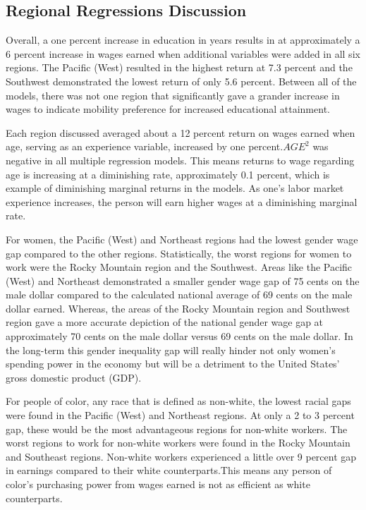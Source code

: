 \documentclass[12pt, English]{article}
\begin{document}
\subsection{Regional Regressions Discussion}
Overall, a one percent increase in education in years results in at approximately a 6 percent increase in wages earned when additional variables were added in all six regions. The Pacific (West) resulted in the highest return at 7.3 percent and the Southwest demonstrated the lowest return of only 5.6 percent. Between all of the models, there was not one region that significantly gave a grander increase in wages to indicate mobility preference for increased educational attainment. 

Each region discussed averaged about a 12 percent return on wages earned when age, serving as an experience variable, increased by one percent.\begin{math} AGE^2 \end{math} was negative in all multiple regression models. This means returns to wage regarding age is increasing at a diminishing rate, approximately 0.1 percent, which is example of diminishing marginal returns in the models. As one’s labor market experience increases, the person will earn higher wages at a diminishing marginal rate.

For women, the Pacific (West) and Northeast regions had the lowest gender wage gap compared to the other regions. Statistically, the worst regions for women to work were the Rocky Mountain region and the Southwest. Areas like the Pacific (West) and Northeast demonstrated a smaller gender wage gap of 75 cents on the male dollar compared to the calculated national average of 69 cents on the male dollar earned. Whereas, the areas of the Rocky Mountain region and Southwest region gave a more accurate depiction of the national gender wage gap at approximately 70 cents on the male dollar versus 69 cents on the male dollar. In the long-term this gender inequality gap will really hinder not only women's spending power in the economy but will be a detriment to the United States' gross domestic product (GDP).

For people of color, any race that is defined as non-white, the lowest racial gaps were found in the Pacific (West) and Northeast regions. At only a 2 to 3 percent gap, these would be the most advantageous regions for non-white workers. The worst regions to work for non-white workers were found in the Rocky Mountain and Southeast regions. Non-white workers experienced a little over 9 percent gap in earnings compared to their white counterparts.This means any person of color's purchasing power from wages earned is not as efficient as white counterparts. 
\end{document}
